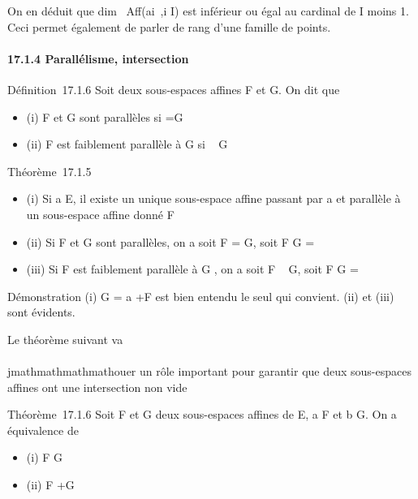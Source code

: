 On en déduit que dim~
Aff(ai~,i \in I) est inférieur ou égal
au cardinal de I moins 1. Ceci permet également de parler de rang d'une
famille de points.

\paragraph{17.1.4 Parallélisme, intersection}

Définition~17.1.6 Soit deux sous-espaces affines F et G. On dit que

\begin{itemize}
\itemsep1pt\parskip0pt
\item
  (i) F et G sont parallèles si \overrightarrowF
  =\overrightarrow G
\item
  (ii) F est faiblement parallèle à G si
  \overrightarrowF \subset~\overrightarrow
  G
\end{itemize}

Théorème~17.1.5

\begin{itemize}
\itemsep1pt\parskip0pt
\item
  (i) Si a \in E, il existe un unique sous-espace affine passant par a et
  parallèle à un sous-espace affine donné F
\item
  (ii) Si F et G sont parallèles, on a soit F = G, soit F \bigcap G = \varnothing~
\item
  (iii) Si F est faiblement parallèle à G , on a soit F \subset~ G, soit F \bigcap G
  = \varnothing~
\end{itemize}

Démonstration (i) G = a +\overrightarrow F est bien
entendu le seul qui convient. (ii) et (iii) sont évidents.

Le théorème suivant va \\\\jmathmathmathmathouer un rôle important pour garantir que deux
sous-espaces affines ont une intersection non vide

Théorème~17.1.6 Soit F et G deux sous-espaces affines de E, a \in F et b \in
G. On a équivalence de

\begin{itemize}
\itemsep1pt\parskip0pt
\item
  (i) F \bigcap G\neq~\varnothing~
\item
  (ii) \overrightarrowab
  \in\overrightarrow F
  +\overrightarrow G
\end{itemize}

